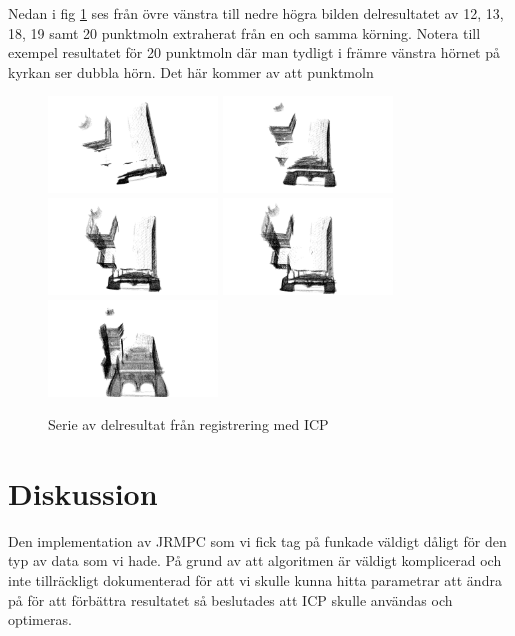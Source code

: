 Nedan i fig \ref{fig:registrered_church_serie} ses från övre vänstra till nedre högra bilden delresultatet av 12, 13, 18, 19 samt 20 punktmoln extraherat från en och samma körning. Notera till exempel resultatet för 20 punktmoln där man tydligt i främre vänstra hörnet på kyrkan ser dubbla hörn. Det här kommer av att punktmoln
\begin{figure}[H]
	\centering
	\includegraphics[width=45mm]{figures/12_pc.png}
	\includegraphics[width=45mm]{figures/13_pc.png}
	\includegraphics[width=45mm]{figures/18_pc.png}
	\includegraphics[width=45mm]{figures/19_pc.png}
	\includegraphics[width=45mm]{figures/20_pc.png}
	\caption{Serie av delresultat från registrering med ICP}
	\label{fig:registrered_church_serie}
\end{figure}

\section{Diskussion}
\label{sec:discussion-karlsson}

Den implementation av JRMPC som vi fick tag på funkade väldigt dåligt för den typ av data som vi hade. På grund av att algoritmen är väldigt komplicerad och inte tillräckligt dokumenterad för att vi skulle kunna hitta parametrar att ändra på för att förbättra resultatet så beslutades att ICP skulle användas och optimeras.

